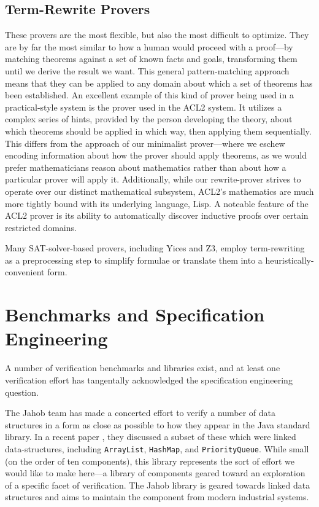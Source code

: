 \subsection{Term-Rewrite Provers}  These provers are the most flexible, but also the most difficult to optimize.  They are by far the most similar to how a human would proceed with a proof---by matching theorems against a set of known facts and goals, transforming them until we derive the result we want.  This general pattern-matching approach means that they can be applied to any domain about which a set of theorems has been established.  An excellent example of this kind of prover being used in a practical-style system is the prover used in the ACL2 system.  It utilizes a complex series of hints, provided by the person developing the theory, about which theorems should be applied in which way, then applying them sequentially.  This differs from the approach of our minimalist prover---where we eschew encoding information about how the prover should apply theorems, as we would prefer mathematicians reason about mathematics rather than about how a particular prover will apply it.  Additionally, while our rewrite-prover strives to operate over our distinct mathematical subsystem, ACL2's mathematics are much more tightly bound with its underlying language, Lisp.  A noteable feature of the ACL2 prover is its ability to automatically discover inductive proofs over certain restricted domains.

Many SAT-solver-based provers, including Yices and Z3, employ term-rewriting as a preprocessing step to simplify formulae or translate them into a heuristically-convenient form.

\section{Benchmarks and Specification Engineering}\label{sec:overviewEngineering}
A number of verification benchmarks and libraries exist, and at least one verification effort has tangentally acknowledged the specification engineering question.

The Jahob team has made a concerted effort to verify a number of data structures in a form as close as possible to how they appear in the Java standard library.  In a recent paper \cite{zee:annotations}, they discussed a subset of these which were linked data-structures, including \texttt{ArrayList}, \texttt{HashMap}, and \texttt{PriorityQueue}.  While small (on the order of ten components), this library represents the sort of effort we would like to make here---a library of components geared toward an exploration of a specific facet of verification.  The Jahob library is geared towards linked data structures and aims to maintain the component from modern industrial systems.  

